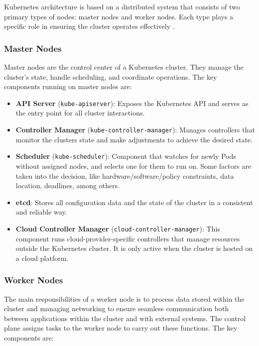\documentclass[a4paper,11pt,openright,BCOR=15mm]{scrbook}
\begin{document}
Kubernetes architecture is based on a distributed system that consists of two primary types of nodes: master nodes and worker nodes. Each type plays a specific role in ensuring the cluster operates effectively \cite{the_linux_foundation_kubernetes_2024}.

\subsubsection{Master Nodes}\label{sect:masters}
Master nodes are the control center of a Kubernetes cluster. They manage the cluster’s state, handle scheduling, and coordinate operations. The key components running on master nodes are:

\begin{itemize}
	\item \textbf{API Server} (\texttt{kube-apiserver}): Exposes the Kubernetes API and serves as the entry point for all cluster interactions.
	\item \textbf{Controller Manager} (\texttt{kube-controller-manager}): Manages controllers that monitor the clusters state and make adjustments to achieve the desired state.
	\item \textbf{Scheduler} (\texttt{kube-scheduler}): Component that watches for newly Pods without assigned nodes, and selects one for them to run on. Some factors are taken into the decision, like hardware/software/policy constraints, data location, deadlines, among others.
	\item \textbf{etcd}: Stores all configuration data and the state of the cluster in a consistent and reliable way.
	\item \textbf{Cloud Controller Manager} (\texttt{cloud-controller-manager}): This component runs cloud-provider-specific controllers that manage resources outside the Kubernetes cluster. It is only active when the cluster is hosted on a cloud platform.
\end{itemize}

\subsubsection{Worker Nodes}

The main responsibilities of a worker node is to process data stored within the cluster and managing networking to ensure seamless communication both between applications within the cluster and with external systems. The control plane assigns tasks to the worker node to carry out these functions. The key components are:
\end{document}
